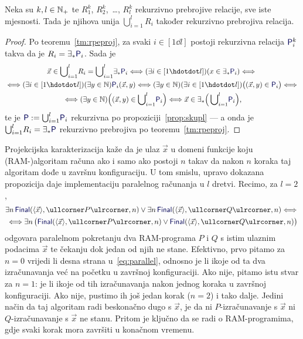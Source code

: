 \begin{propozicija}[{name=[rekurzivna prebrojivost unije rekurzivno prebrojivih relacija]}]\label{pp:unlre}
Neka su $k,l\in{\mathbb N}_+$ te $R_1^k$, $R_2^k$,~\ldots, $R_l^k$ rekurzivno prebrojive relacije, sve iste mjesnosti. Tada je njihova unija $\bigcup_{i=1}^l\! R_i$ također rekurzivno prebrojiva relacija.
\end{propozicija}
\begin{proof}
Po teoremu~\ref{tm:rpeproj}, za svaki $i\in[1\dd l]$ postoji rekurzivna relacija $\f P^k_i$ takva da je $R_i=\exists_*\f P_i$. Sada je
\begin{multline}\label{eq:urere}
    \vec x\in\bigcup\nolimits_{i=1}^l\! R_i=\bigcup\nolimits_{i=1}^l\!\exists_*\f P_i\Longleftrightarrow
    (\exists i\in[1\dd l])(x\in\exists_*\f P_i)\Longleftrightarrow{}\\
    {}\Longleftrightarrow(\exists i\in[1\dd l])(\exists y\in\N)\f P_i(\vec x,y)\Longleftrightarrow(\exists y\in\N)(\exists i\in[1\dd l])\bigl((\vec x,y)\in\f P_i\bigr)\Longleftrightarrow{}\\
    {}\Longleftrightarrow
    (\exists y\in\N)\Bigl((\vec x,y)\in\bigcup\nolimits_{i=1}^l\!\f P_i\Bigr)\Longleftrightarrow\vec x\in\exists_*\Bigl(\,\bigcup\nolimits_{i=1}^l\!\f P_i\Bigr)\text,
\end{multline}
te je $\f P:=\bigcup_{i=1}^l\!\f P_i$ rekurzivna po propoziciji~\ref{prop:skupl} --- a onda je $\bigcup_{i=1}^l\! R_i=\exists_*\f P$ rekurzivno prebrojiva po teoremu~\ref{tm:rpeproj}.
\end{proof}

Projekcijska karakterizacija kaže da je ulaz $\vec x$ u domeni funkcije koju (RAM-\!)algoritam računa ako i samo ako postoji $n$ takav da nakon $n$ koraka taj algoritam dođe u završnu konfiguraciju. U tom smislu, upravo dokazana propozicija daje implementaciju paralelnog računanja u $l$ dretvi. Recimo, za $l=2$,
\begin{multline}\label{eq:parallel}
    \exists n\,\f{Final}(\kr{\vec x},\kprog P,n)\lor\exists n\,\f{Final}(\kr{\vec x},\kprog Q,n)\Longleftrightarrow{}\\
    {}\Longleftrightarrow\exists n\,\bigl(\f{Final}(\kr{\vec x},\kprog P,n)\lor\f{Final}(\kr{\vec x},\kprog Q,n)\bigr)
\end{multline}
odgovara paralelnom pokretanju dva RAM-programa $P$ i $Q$ s istim ulaznim podacima $\vec x$ te čekanju dok jedan od njih ne stane. Efektivno, prvo pitamo za $n=0$ vrijedi li desna strana u~\eqref{eq:parallel}, odnosno je li ikoje od ta dva izračunavanja već na početku u završnoj konfiguraciji. Ako nije, pitamo istu stvar za $n=1$: je li ikoje od tih izračunavanja nakon jednog koraka u završnoj konfiguraciji. Ako nije, pustimo ih još jedan korak ($n=2$) i tako dalje. Jedini način da taj algoritam radi beskonačno dugo s $\vec x$, je da ni $P$-izračunavanje s $\vec x$ ni $Q$-izračunavanje s $\vec x$ ne stanu. Pritom je ključno da se radi o RAM-programima, gdje svaki korak mora završiti u konačnom vremenu.

